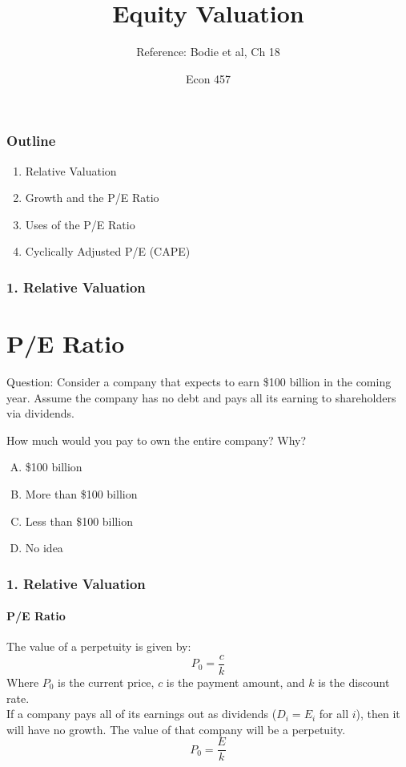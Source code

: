 \documentclass{beamer}
\title{Equity Valuation}
\subtitle{Reference: Bodie et al, Ch 18}
\author{Econ 457}
\date{\week}
\begin{document}
\frame{\titlepage}

\begin{frame}
    \frametitle{Outline}

    \begin{enumerate}
        \item Relative Valuation 
        \item Growth and the P/E Ratio
        \item Uses of the P/E Ratio
        \item Cyclically Adjusted P/E (CAPE)
    \end{enumerate}

\end{frame}

\begin{frame}[t]
    \frametitle{1. Relative Valuation}
    \section{P/E Ratio}

    Question: Consider a company that expects to earn \$100 billion in the coming year. Assume the company has no debt and pays all its earning to shareholders via dividends.
    
    \vspace{1em}
    How much would you pay to own the entire company? Why?
    \begin{enumerate}[(A)]
        \item \$100 billion
        \item More than \$100 billion
        \item Less than \$100 billion
        \item No idea
    \end{enumerate}
    \vspace{1em}

\end{frame}

\begin{frame}[t]
    \frametitle{1. Relative Valuation}
    \framesubtitle{P/E Ratio}

    The value of a perpetuity is given by:
    $$P_0 = \frac{c}{k}$$
    Where $P_0$ is the current price, $c$ is the payment amount, and $k$ is the discount rate.\\
    \vspace{1em}
    If a company pays all of its earnings out as dividends ($D_i=E_i$ for all $i$), then it will have no growth.  The value of that company will be a perpetuity.\\
    $$P_0 = \frac{E}{k}$$

        
\end{frame}
\end{document}

